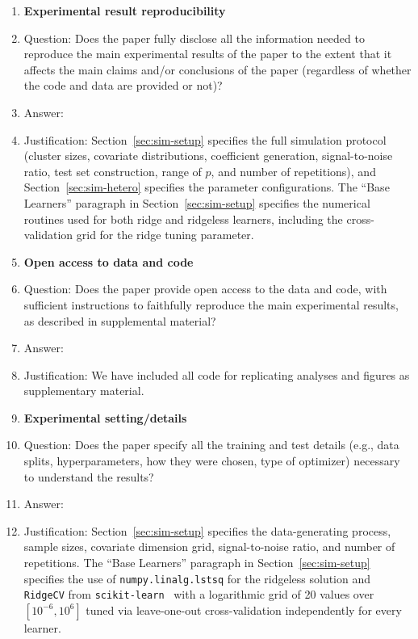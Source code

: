 \begin{enumerate}
    \item {\bf Experimental result reproducibility}
    \item[] Question: Does the paper fully disclose all the information needed to reproduce the main experimental results of the paper to the extent that it affects the main claims and/or conclusions of the paper (regardless of whether the code and data are provided or not)?
    \item[] Answer: \answerYes{} %
    \item[] Justification: Section~\ref{sec:sim-setup} specifies the full simulation protocol (cluster sizes, covariate distributions, coefficient generation, signal-to-noise ratio, test set construction, range of $p$, and number of repetitions), and Section~\ref{sec:sim-hetero} specifies the parameter configurations. The ``Base Learners'' paragraph in Section~\ref{sec:sim-setup} specifies the numerical routines used for both ridge and ridgeless learners, including the cross-validation grid for the ridge tuning parameter. 
    
\item {\bf Open access to data and code}
    \item[] Question: Does the paper provide open access to the data and code, with sufficient instructions to faithfully reproduce the main experimental results, as described in supplemental material?
    \item[] Answer: \answerYes{} %
    \item[] Justification: We have included all code for replicating analyses and figures as supplementary material.
    

\item {\bf Experimental setting/details}
    \item[] Question: Does the paper specify all the training and test details (e.g., data splits, hyperparameters, how they were chosen, type of optimizer) necessary to understand the results?
    \item[] Answer: \answerYes{} %
    \item[] Justification: Section~\ref{sec:sim-setup} specifies the data-generating process, sample sizes, covariate dimension grid, signal-to-noise ratio, and number of repetitions. The ``Base Learners'' paragraph in Section~\ref{sec:sim-setup} specifies the use  of \texttt{numpy.linalg.lstsq} for the ridgeless solution and \texttt{RidgeCV} from \texttt{scikit-learn}~\citep{pedregosa2011scikit} with a logarithmic grid of 20 values over $[10^{-6}, 10^{6}]$ tuned via leave-one-out cross-validation independently for every learner.
   


\end{enumerate}
